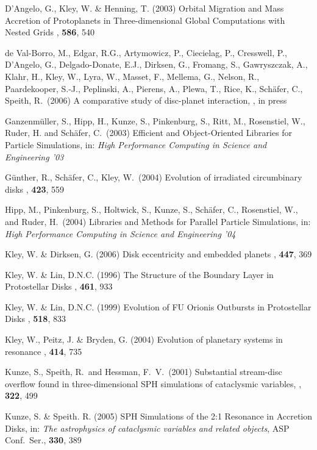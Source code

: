 \begin{ownpubl}
\item {D'Angelo}, G., {Kley}, W. \& {Henning}, T. (2003)
   Orbital Migration and Mass Accretion of Protoplanets in
   Three-dimensional Global Computations with Nested Grids
   \apj, \textbf{586}, 540
\item de Val-Borro, M., Edgar, R.G., Artymowicz, P., Ciecielag, P.,
   Cresswell, P., D'Angelo, G., Delgado-Donate, E.J., Dirksen, G.,
   Fromang, S., Gawryszczak, A., Klahr, H., Kley, W., Lyra, W., Masset,
   F., Mellema, G., Nelson, R., Paardekooper, S.-J., Peplinski, A.,
   Pierens, A., Plewa, T., Rice, K., Sch\"afer, C., Speith, R.\ (2006)
   A comparative study of disc-planet interaction, \mn, in press
\item Ganzenm\"uller, S., Hipp, H., Kunze, S.,
Pinkenburg, S., Ritt, M., Rosenstiel, W., Ruder, H. and Sch\"afer,
C.\ (2003) Efficient and Object-Oriented Libraries for Particle Simulations, in:
\textit{High Performance Computing in Science and Engineering '03}
\item G\"unther, R., Sch\"afer, C., Kley, W.\ (2004)
   Evolution of irradiated circumbinary disks
   \aap, \textbf{423}, 559
\item Hipp, M., Pinkenburg, S., Holtwick, S., Kunze, S., Sch\"afer, C.,
Rosenstiel, W., and Ruder, H.\ (2004) Libraries and Methods for Parallel
Particle Simulations, in: \textit{High Performance Computing in Science
and Engineering '04}
\item Kley, W. \& Dirksen, G. (2006)
   Disk eccentricity and embedded planets
   \aap, \textbf{447}, 369
\item Kley, W. \& Lin, D.N.C. (1996)
   The Structure of the Boundary Layer in Protostellar Disks
   \apj, \textbf{461}, 933
\item Kley, W. \& Lin, D.N.C. (1999)
   Evolution of FU Orionis Outbursts in Protostellar Disks
   \apj, \textbf{518}, 833
\item Kley, W., {Peitz}, J. \& {Bryden}, G. (2004)
   Evolution of planetary systems in resonance
   \aap, \textbf{414}, 735
\item Kunze, S., Speith, R.~and Hessman,
F.~V.~(2001) Substantial stream-disc overflow found in three-dimensional
SPH simulations of cataclysmic variables, \mn, \textbf{322}, 499
\item Kunze, S. \& Speith. R. (2005)
   SPH Simulations of the 2:1 Resonance in Accretion Disks,
   in: \textit{The astrophysics of cataclysmic variables and related
     objects}, ASP Conf.\ Ser., {\bf 330}, 389

\end{ownpubl}
